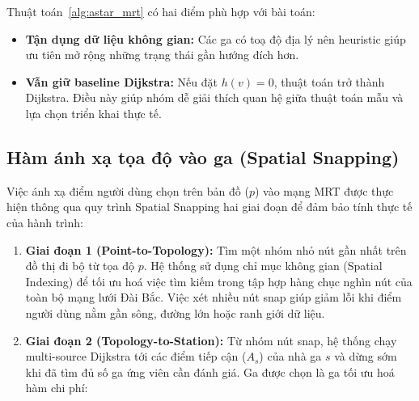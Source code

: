 \documentclass[../DoAn.tex]{subfiles}
\begin{document}
\begin{algorithm}[H]
\DontPrintSemicolon
\SetAlgoLined
{}
\caption{A* Search trên đồ thị MRT mở rộng}
\label{alg:astar_mrt}
\end{algorithm}

Thuật toán~\ref{alg:astar_mrt} có hai điểm phù hợp với bài toán:
\begin{itemize}
    \item \textbf{Tận dụng dữ liệu không gian:} Các ga có toạ độ địa lý nên heuristic giúp ưu tiên mở rộng những trạng thái gần hướng đích hơn.
    \item \textbf{Vẫn giữ baseline Dijkstra:} Nếu đặt \(h(v)=0\), thuật toán trở thành Dijkstra. Điều này giúp nhóm dễ giải thích quan hệ giữa thuật toán mẫu và lựa chọn triển khai thực tế.
\end{itemize}

\subsection{Hàm ánh xạ tọa độ vào ga (Spatial Snapping)}
Việc ánh xạ điểm người dùng chọn trên bản đồ ($p$) vào mạng MRT được thực hiện thông qua quy trình Spatial Snapping hai giai đoạn để đảm bảo tính thực tế của hành trình:
\begin{enumerate}
    \item \textbf{Giai đoạn 1 (Point-to-Topology):} Tìm một nhóm nhỏ nút gần nhất trên đồ thị đi bộ từ tọa độ $p$.
Hệ thống sử dụng chỉ mục không gian (Spatial Indexing) để tối ưu hoá việc tìm kiếm trong tập hợp hàng chục nghìn nút của toàn bộ mạng lưới Đài Bắc. Việc xét nhiều nút snap giúp giảm lỗi khi điểm người dùng nằm gần sông, đường lớn hoặc ranh giới dữ liệu.
    \item \textbf{Giai đoạn 2 (Topology-to-Station):} Từ nhóm nút snap, hệ thống chạy multi-source Dijkstra tới các điểm tiếp cận ($A_s$) của nhà ga $s$ và dừng sớm khi đã tìm đủ số ga ứng viên cần đánh giá.
Ga được chọn là ga tối ưu hoá hàm chi phí:
\end{enumerate}
\end{document}
